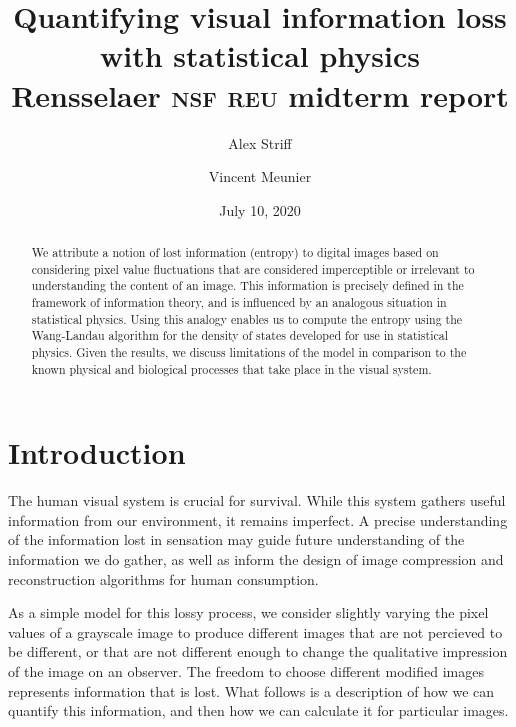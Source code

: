 \documentclass[aps,reprint]{revtex4-2}
\theoremstyle{plain}
\theoremstyle{definition}
\begin{document}
\title{Quantifying visual information loss with statistical physics\\
Rensselaer \textsc{nsf} \textsc{reu} midterm report}
\author{Alex Striff}
\author{Vincent Meunier}
\date{July 10, 2020}
\begin{abstract}
  We attribute a notion of lost information (entropy) to digital images based on
  considering pixel value fluctuations that are considered imperceptible or
  irrelevant to understanding the content of an image. This information is
  precisely defined in the framework of information theory, and is influenced by
  an analogous situation in statistical physics. Using this analogy enables us
  to compute the entropy using the Wang-Landau algorithm for the density of
  states developed for use in statistical physics. Given the results, we discuss
  limitations of the model in comparison to the known physical and biological
  processes that take place in the visual system.
\end{abstract}
\maketitle

\section{Introduction}

The human visual system is crucial for survival. While this system gathers
useful information from our environment, it remains imperfect. A precise
understanding of the information lost in sensation may guide future
understanding of the information we do gather, as well as inform the design of
image compression and reconstruction algorithms for human consumption.

As a simple model for this lossy process, we consider slightly varying the pixel
values of a grayscale image to produce different images that are not percieved
to be different, or that are not different enough to change the qualitative
impression of the image on an observer. The freedom to choose different modified
images represents information that is lost. What follows is a description of how
we can quantify this information, and then how we can calculate it for
particular images.
\end{document}
